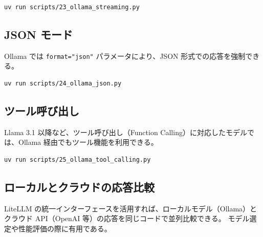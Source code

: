 \documentclass[a4paper,11pt]{ltjsarticle}
\newcommand{\code}[1]{\texttt{#1}}
\begin{document}


\begin{lstlisting}[style=bash]
uv run scripts/23_ollama_streaming.py
\end{lstlisting}

\subsection{JSON モード}
\label{subsec:ollama_json}

Ollama では \code{format="json"} パラメータにより、JSON 形式での応答を強制できる。



\begin{lstlisting}[style=bash]
uv run scripts/24_ollama_json.py
\end{lstlisting}

\subsection{ツール呼び出し}
\label{subsec:ollama_tool}

Llama 3.1 以降など、ツール呼び出し（Function Calling）に対応したモデルでは、Ollama 経由でもツール機能を利用できる。



\begin{lstlisting}[style=bash]
uv run scripts/25_ollama_tool_calling.py
\end{lstlisting}

\subsection{ローカルとクラウドの応答比較}
\label{subsec:local_cloud_compare}

LiteLLM の統一インターフェースを活用すれば、ローカルモデル（Ollama）とクラウド API（OpenAI 等）の応答を同じコードで並列比較できる。
モデル選定や性能評価の際に有用である。


\end{document}
